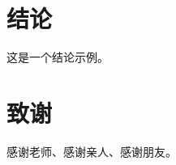 \documentclass[a4paper,twoside]{ctexrep} %
\begin{document}
\chapter*{结论}
这是一个结论示例。




\clearpage
{}
\songti
\linespread{1.0}   
\centering
{} %



\chapter*{致谢}

感谢老师、感谢亲人、感谢朋友。
\end{document}
